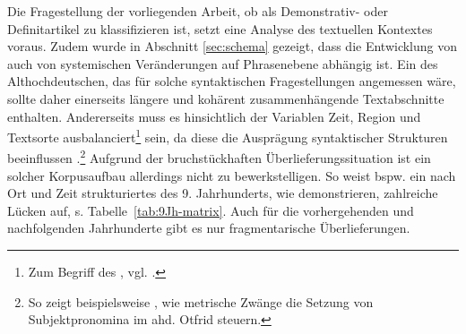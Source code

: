 Die Fragestellung der vorliegenden Arbeit, ob  als Demonstrativ-  oder Definitartikel  zu klassifizieren ist, setzt eine Analyse des textuellen Kontextes voraus. Zudem wurde in Abschnitt \ref{sec:schema} gezeigt, dass die Entwicklung von  auch von systemischen Veränderungen auf Phrasenebene  abhängig ist. Ein  des Althochdeutschen, das für solche syntaktischen Fragestellungen angemessen wäre, sollte daher einerseits längere und kohärent zusammenhängende Textabschnitte enthalten. Andererseits muss es hinsichtlich der Variablen Zeit, Region und Textsorte ausbalanciert\footnote{Zum Begriff des , vgl. \cite[6]{Atkins1992}.} sein, da diese die Ausprägung syntaktischer Strukturen  beeinflussen \parencite[74]{Fleischer2011}.\footnote{So zeigt beispielsweise \textcite[47]{Eggenberger1961}, wie metrische  Zwänge die Setzung von Subjektpronomina im ahd. Otfrid steuern.} Aufgrund der bruchstückhaften Überlieferungssituation ist ein solcher Korpusaufbau  allerdings nicht zu bewerkstelligen. So weist bspw. ein nach Ort und Zeit strukturiertes  des 9. Jahrhunderts, wie \textcite{Fleischer2011} demonstrieren, zahlreiche Lücken auf,  s. Tabelle~\ref{tab:9Jh-matrix}. Auch für die vorhergehenden und nachfolgenden Jahrhunderte gibt es nur fragmentarische Überlieferungen.

\begin{table}
\caption{Strukturiertes  des 9. Jh. \parencite[75]{Fleischer2011} (T = Tatian, O = Otfrid, MF = Monseer Fragmente)\label{tab:9Jh-matrix}}
\end{table}  

